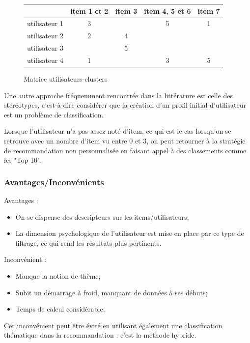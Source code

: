 \documentclass{article}
\begin{document}
 \begin{figure}[!h]
\begin{center}
\begin{tabular}{|c|c|c|c|c|}
\hline
&item 1 et 2&item 3&item 4, 5 et 6&item 7\\
\hline
utilisateur 1&3&&5&1\\
\hline
utilisateur 2&2&4&&\\
\hline
utilisateur 3&&5&&\\
\hline
utilisateur 4&1&&3&5\\
\hline
\end{tabular}
\newline\newline
\caption{Matrice utilisateurs-clusters}
\end{center}
\end{figure}

Une autre approche fréquemment rencontrée dans la littérature est celle des stéréotypes, c'est-à-dire considérer que la création d'un profil initial d'utilisateur est un problème de classification.



Lorsque l'utilisateur n'a pas assez noté d'item, ce qui est le cas lorsqu'on se retrouve avec un nombre d'item vu entre 0 et 3, on peut retourner à la stratégie de recommandation non personnalisée en faisant appel à des classements comme les "Top 10".\cite{theseClu} 

\subsubsection{Avantages/Inconvénients}

Avantages : 
\begin{itemize}
    \item On se dispense des descripteurs sur les items/utilisateurs;
    \item La dimension psychologique de l'utilisateur est mise en place par ce type de filtrage, ce qui rend les résultats plus pertinents.
\end{itemize}
Inconvénient :
\begin{itemize}
    \item Manque la notion de thème;
    \item Subit un démarrage à froid, manquant de données à ses débuts;
    \item Temps de calcul considérable;
\end{itemize}
Cet inconvénient peut être évité en utilisant également une classification thématique dans la recommandation : c'est la méthode hybride.
\end{document}
